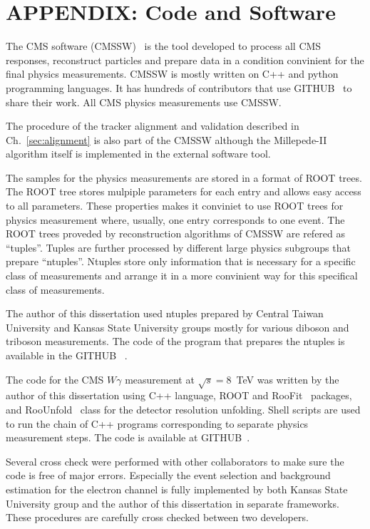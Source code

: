 \section{APPENDIX: Code and Software}
\label{sec:Code}


The CMS software (CMSSW)~\cite{ref_CMSSW} is the tool developed to process all CMS responses, reconstruct particles and prepare data in a condition convinient for the final physics measurements. CMSSW is mostly written on C++ and python programming languages. It has hundreds of contributors that use GITHUB~\cite{ref_GITHUB} to share their work. All CMS physics measurements use CMSSW.

The procedure of the tracker alignment and validation described in Ch.~\ref{sec:alignment} is also part of the CMSSW although the Millepede-II algorithm itself is implemented in the external software tool.

The samples for the physics measurements are stored in a format of ROOT trees. The ROOT tree stores mulpiple parameters for each entry and allows easy access to all parameters. These properties makes it conviniet to use ROOT trees for physics measurement where, usually, one entry corresponds to one event. The ROOT trees proveded by reconstruction algorithms of CMSSW are refered as ``tuples''. Tuples are further processed by different large physics subgroups that prepare ``ntuples''. Ntuples store only information that is necessary for a specific class of measurements and arrange it in a more convinient way for this specifical class of measurements.  

The author of this dissertation used ntuples prepared by Central Taiwan University and Kansas State University groups mostly for various diboson and triboson measurements. The code of the program that prepares the ntuples is available in the GITHUB~\cite{ref_ggNtuplizer} .

The code for the CMS $W\gamma$ measurement at $\sqrt{s}=8$~TeV was written by the author of this dissertation using C++ language, ROOT and RooFit~\cite{ref_RooFit} packages, and RooUnfold~\cite{ref_RooUnfold} class for the detector resolution unfolding. Shell scripts are used to run the chain of C++ programs corresponding to separate physics measurement steps. The code is available at GITHUB~\cite{ref_GITHUB}.

Several cross check were performed with other collaborators to make sure the code is free of major errors. Especially the event selection and background estimation for the electron channel is fully implemented by both Kansas State University group and the author of this dissertation in separate frameworks. These procedures are carefully cross checked between two developers.  
